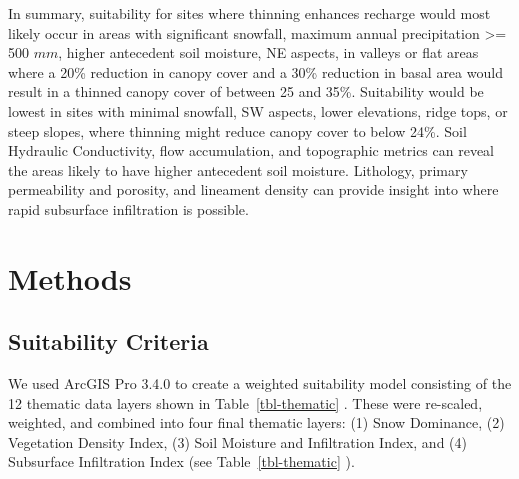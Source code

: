 \documentclass[
  number,
  preprint,
  3p,
  onecolumn]{elsarticle}
\begin{document}
In summary, suitability for sites where thinning enhances recharge would
most likely occur in areas with significant snowfall, maximum annual
precipitation \textgreater= 500 \(mm\), higher antecedent soil moisture,
NE aspects, in valleys or flat areas where a 20\% reduction in canopy
cover and a 30\% reduction in basal area would result in a thinned
canopy cover of between 25 and 35\%. Suitability would be lowest in
sites with minimal snowfall, SW aspects, lower elevations, ridge tops,
or steep slopes, where thinning might reduce canopy cover to below 24\%.
Soil Hydraulic Conductivity, flow accumulation, and topographic metrics
can reveal the areas likely to have higher antecedent soil moisture.
Lithology, primary permeability and porosity, and lineament density can
provide insight into where rapid subsurface infiltration is possible.

\section{Methods}\label{methods}

\subsection{Suitability Criteria}\label{suitability-criteria}

We used ArcGIS Pro 3.4.0 to create a weighted suitability model
consisting of the 12 thematic data layers shown in
Table~\ref{tbl-thematic} . These were re-scaled, weighted, and combined
into four final thematic layers: (1) Snow Dominance, (2) Vegetation
Density Index, (3) Soil Moisture and Infiltration Index, and (4)
Subsurface Infiltration Index (see Table~\ref{tbl-thematic} ).
\end{document}
